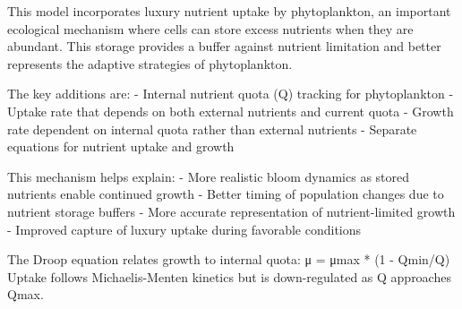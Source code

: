 This model incorporates luxury nutrient uptake by phytoplankton, an important ecological mechanism where cells can store excess nutrients when they are abundant. This storage provides a buffer against nutrient limitation and better represents the adaptive strategies of phytoplankton.

The key additions are:
- Internal nutrient quota (Q) tracking for phytoplankton
- Uptake rate that depends on both external nutrients and current quota
- Growth rate dependent on internal quota rather than external nutrients
- Separate equations for nutrient uptake and growth

This mechanism helps explain:
- More realistic bloom dynamics as stored nutrients enable continued growth
- Better timing of population changes due to nutrient storage buffers
- More accurate representation of nutrient-limited growth
- Improved capture of luxury uptake during favorable conditions

The Droop equation relates growth to internal quota: μ = μmax * (1 - Qmin/Q)
Uptake follows Michaelis-Menten kinetics but is down-regulated as Q approaches Qmax.
